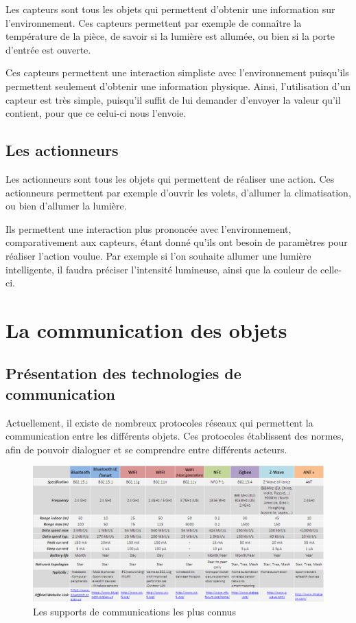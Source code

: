 Les capteurs sont tous les objets qui permettent d'obtenir une information sur l'environnement. Ces capteurs 
permettent par exemple de connaître la température de la pièce, de savoir si la lumière est allumée, ou 
bien si la porte d'entrée est ouverte.

Ces capteurs permettent une interaction simpliste avec l'environnement puisqu'ils permettent seulement 
d'obtenir une information physique. Ainsi, l'utilisation d'un capteur est très simple, puisqu'il suffit de 
lui demander d'envoyer la valeur qu'il contient, pour que ce celui-ci nous l'envoie.
	\subsection{Les actionneurs}
	
Les actionneurs sont tous les objets qui permettent de réaliser une action. Ces actionneurs permettent par 
exemple d'ouvrir les volets, d'allumer la climatisation, ou bien d'allumer la lumière.

Ils permettent une interaction plus prononcée avec l'environnement, comparativement aux capteurs, étant donné 
qu'ils ont besoin de paramètres pour réaliser l'action voulue. Par exemple si l'on souhaite allumer une 
lumière intelligente, il faudra préciser l'intensité lumineuse, ainsi que la couleur de celle-ci.

\section{La communication des objets}
	\subsection{Présentation des technologies de communication}
Actuellement, il existe de nombreux protocoles réseaux qui permettent la communication entre les différents 
objets. Ces protocoles établissent des normes, afin de pouvoir dialoguer et se comprendre entre différents 
acteurs.

\begin{figure}[!ht]
         \centering
         \includegraphics[width=1.05\textwidth]{img/tableau-total.png}
         \caption{Les supports de communications les plus connus}
         \label{supports}
\end{figure}

